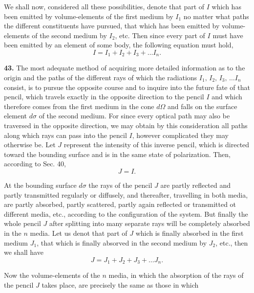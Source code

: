 \documentclass[12pt,oneside]{book}
\begin{document}
We shall now, considered all these possibilities, denote that part of $I$ which has been emitted by volume-elements of the first medium by $I_1$ no matter what paths the different constituents have pursued, that which has been emitted by volume-elements of the second medium by $I_2$, etc. Then since every part of $I$ must have been emitted by an element of some body, the following equation must hold, 
\begin{equation}
    \label{eq44}
    I=I_1+I_2+I_3+\dots I_n.
\end{equation} \par 

\textbf{43.} The most adequate method of acquiring more detailed information as to the origin and the paths of the different rays of which the radiations $I_1,\, I_2,\, I_3,\,\dots I_n$ consist, is to pursue the opposite course and to inquire into the future fate of that pencil, which travels exactly in the opposite direction to the pencil $I$ and which therefore comes from the first medium in the cone $d\Omega$ and falls on the surface element $d\sigma$ of the second medium. For since every optical path may also be traversed in the opposite direction, we may obtain by this consideration all paths along which rays can pass into the pencil $I$, however complicated they may otherwise be. Let $J$ represent the intensity of this inverse pencil, which is directed toward the bounding surface and is in the same state of polarization. Then, according to Sec. 40, 
\begin{equation}
    \label{eq45}
    J=I.
\end{equation} \par 

At the bounding surface $d\sigma$ the rays of the pencil $J$ are partly reflected and partly transmitted regularly or diffusely, and thereafter, travelling in both media, are partly absorbed, partly scattered, partly again reflected or transmitted ot different media, etc., according to the configuration of the system. But finally the whole pencil $J$ after splitting into many separate rays will be completely absorbed in the $n$ media. Let us denot that part of $J$ which is finally absorbed in
the first medium $J_1$, that which is finally absorved in the second medium by $J_2$, etc., then we shall have
\begin{equation}
  J=J_1+J_2+J_3+\dots J_n.
\end{equation} \par

Now the volume-elements of the $n$ media, in which the absorption of the rays of the pencil $J$ takes place, are precisely the same as those in which 
\end{document}
